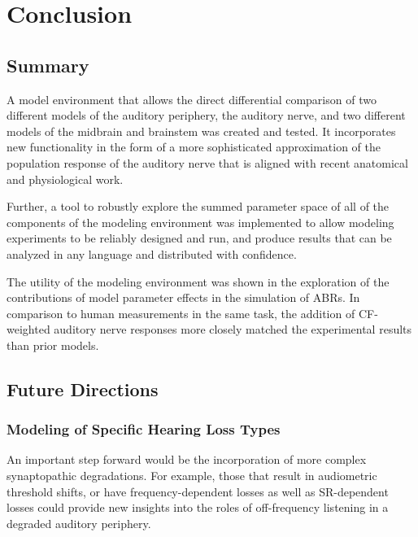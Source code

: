 \chapter{Conclusion}
\label{chapter:Conclusion}
\thispagestyle{myheadings}

\graphicspath{{7_Conclusion/Figures/}}

\section{Summary} %
\label{sec:conclusion}
A model environment that allows the direct differential comparison of two different models of the auditory periphery, the auditory nerve, and two different models of the midbrain and brainstem was created and tested.  It incorporates new functionality in the form of a more sophisticated approximation of the population response of the auditory nerve that is aligned with recent anatomical and physiological work.  

Further, a tool to robustly explore the summed parameter space of all of the components of the modeling environment was implemented to allow modeling experiments to be reliably designed and run, and produce results that can be analyzed in any language and distributed with confidence. 

The utility of the modeling environment was shown in the exploration of the contributions of model parameter effects in the simulation of ABRs.  In comparison to human measurements in the same task, the addition of CF-weighted auditory nerve responses more closely matched the experimental results than prior models.

\section{Future Directions} %
\label{sec:future_directions}
\subsection{Modeling of Specific Hearing Loss Types} %
\label{sub:modeling_of_specific_hearing_loss_types}
An important step forward would be the incorporation of more complex synaptopathic degradations.  For example, those that result in audiometric threshold shifts, or have frequency-dependent losses as well as SR-dependent losses could provide new insights into the roles of off-frequency listening in a degraded auditory periphery.

